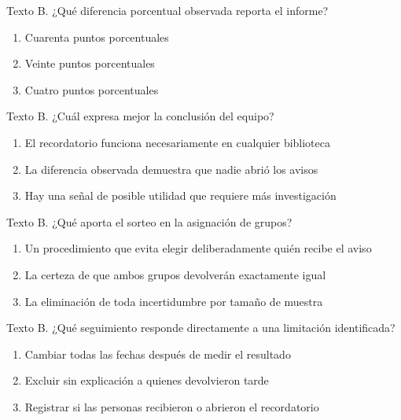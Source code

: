 \noindent\begin{minipage}{\linewidth}\setlength{\parskip}{4pt}\label{q:L-009}
Texto B. ¿Qué diferencia porcentual observada reporta el informe?
\begin{enumerate}[label=\Alph*),nosep]
\item Cuarenta puntos porcentuales
\item Veinte puntos porcentuales
\item Cuatro puntos porcentuales
\end{enumerate}\end{minipage}\par\medskip

\noindent\begin{minipage}{\linewidth}\setlength{\parskip}{4pt}\label{q:L-010}
Texto B. ¿Cuál expresa mejor la conclusión del equipo?
\begin{enumerate}[label=\Alph*),nosep]
\item El recordatorio funciona necesariamente en cualquier biblioteca
\item La diferencia observada demuestra que nadie abrió los avisos
\item Hay una señal de posible utilidad que requiere más investigación
\end{enumerate}\end{minipage}\par\medskip

\noindent\begin{minipage}{\linewidth}\setlength{\parskip}{4pt}\label{q:L-011}
Texto B. ¿Qué aporta el sorteo en la asignación de grupos?
\begin{enumerate}[label=\Alph*),nosep]
\item Un procedimiento que evita elegir deliberadamente quién recibe el aviso
\item La certeza de que ambos grupos devolverán exactamente igual
\item La eliminación de toda incertidumbre por tamaño de muestra
\end{enumerate}\end{minipage}\par\medskip

\noindent\begin{minipage}{\linewidth}\setlength{\parskip}{4pt}\label{q:L-012}
Texto B. ¿Qué seguimiento responde directamente a una limitación identificada?
\begin{enumerate}[label=\Alph*),nosep]
\item Cambiar todas las fechas después de medir el resultado
\item Excluir sin explicación a quienes devolvieron tarde
\item Registrar si las personas recibieron o abrieron el recordatorio
\end{enumerate}\end{minipage}\par\medskip

